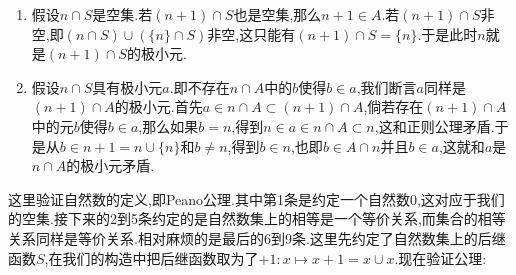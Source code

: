 \begin{enumerate}
\begin{enumerate}
		\item 假设$n\cap S$是空集.若$(n+1)\cap S$也是空集,那么$n+1\in A$.若$(n+1)\cap S$非空,即$(n\cap S)\cup(\{n\}\cap S)$非空,这只能有$(n+1)\cap S=\{n\}$.于是此时$n$就是$(n+1)\cap S$的极小元.
		\item 假设$n\cap S$具有极小元$a$.即不存在$n\cap A$中的$b$使得$b\in a$,我们断言$a$同样是$(n+1)\cap A$的极小元.首先$a\in n\cap A\subset (n+1)\cap A$,倘若存在$(n+1)\cap A$中的元$b$使得$b\in a$,那么如果$b=n$,得到$n\in a\in n\cap A\subset n$,这和正则公理矛盾.于是从$b\in n+1=n\cup\{n\}$和$b\not=n$,得到$b\in n$,也即$b\in A\cap n$并且$b\in a$,这就和$a$是$n\cap A$的极小元矛盾.
	\end{enumerate}
\end{enumerate}

这里验证自然数的定义,即Peano公理.其中第1条是约定一个自然数0,这对应于我们的空集.接下来的2到5条约定的是自然数集上的相等是一个等价关系,而集合的相等关系同样是等价关系.相对麻烦的是最后的6到9条.这里先约定了自然数集上的后继函数$S$,在我们的构造中把后继函数取为了$+1:x\mapsto x+1=x\cup{x}$.现在验证公理:
